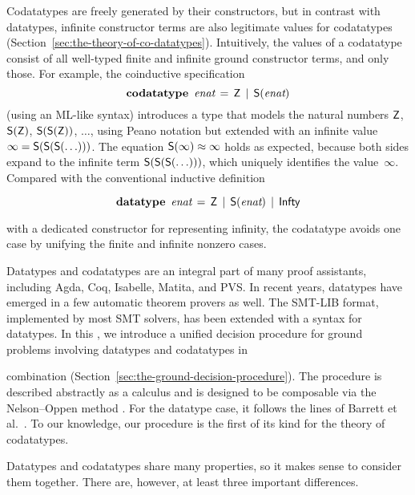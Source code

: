 Codatatypes are freely generated by their constructors, but in contrast with datatypes,
infinit\-e constructor terms are also legitimate values for codatatypes
(Section~\ref{sec:the-theory-of-co-datatypes}). Intuitively, the
values of a codatatype consist of all well-typed finite and infinite ground
constructor
terms, and only those. For example, the coinductive specification
%
\[\textbf{codatatype}~\,\textit{enat} \,=\, \textsf{Z} \,\mid\, \textsf{S}(\textit{enat})\]
%
(using an ML-like syntax) introduces a type that
models the natural numbers $\textsf{Z}$, $\textsf{S}(\textsf{Z})$, $\textsf{S}(\textsf{S}(\textsf{Z}))$, $\ldots$\afterLdots{},
using Peano notation but extended with an
infinite value $\infty = \textsf{S}(\textsf{S}(\textsf{S}(\ldots)))$.
The equation $\textsf{S}(\infty) \approx \infty$ holds as expected,
because both sides expand to the infinite term
$\textsf{S}(\textsf{S}(\textsf{S}(\ldots)))$, which uniquely identifies the
value~$\infty$.
Compared with the conventional inductive definition
\begin{rep}
\[\textbf{datatype}~\,\textit{enat} \,=\, \textsf{Z} \,\mid\, \textsf{S}(\textit{enat}) \,\mid\, \textsf{Infty}\]
\end{rep}
with a dedicated constructor for representing infinity, the codatatype avoids
one case by unifying the finite and infinite nonzero cases.

\nopagebreak

Datatypes and codatatypes are an integral part of many proof assistants,
including Agda, Coq, Isabelle, Matita, and PVS. In recent years, datatypes
have emerged in a few automatic theorem provers as well. The SMT-LIB
format, implemented by most SMT
solvers, has been extended with a syntax for datatypes.
In this \thewordpaper, we introduce a unified decision procedure for ground
problems involving datatypes and codatatypes in
\begin{conf}\goodbreak\noindent\end{conf}%
combination (Section~\ref{sec:the-ground-decision-procedure}).
The procedure is described abstractly as a calculus and is
designed to be composable via the Nelson--Oppen method \cite{nelson-oppen-1979}.
For the datatype case, it follows the lines of Barrett et al.\ \cite{barrett-et-al-2007}.
To our knowledge, our procedure is the first of its kind for the theory of
codatatypes.

Datatypes and codatatypes share many properties, so it makes sense
to consider them together. There are, however, at least three important
differences.

